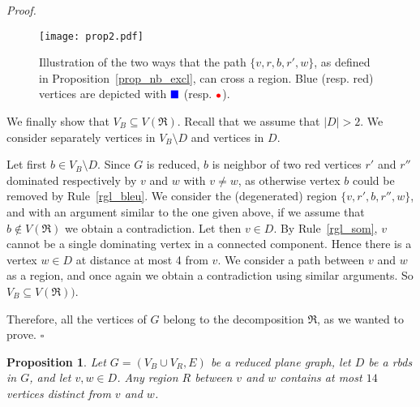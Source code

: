 \documentclass[a4paper,11pt]{article}
\newtheorem{prop} {Proposition}
\newcommand{\rrgl}   [1] {Rule~\ref{#1}\xspace}
\newcommand{\drb}    [0] {rbds\xspace}
\newenvironment{proof}{\noindent \textit{Proof. }}{\hfill$\square$\vspace{.2cm}}
\begin{document}
\begin{proof}
\begin{figure}[h]
\begin{center}
   \texttt{[image: prop2.pdf]}
\end{center}
   \caption{Illustration of the two ways that the path $\{v,r,b,r',w\}$, as defined in Proposition~\ref{prop_nb_excl}, can cross a region. Blue (resp. red) vertices are depicted with $\textcolor{blue}{\blacksquare}$ (resp. \LARGE{$\textcolor{red} {\bullet}$}\normalsize{)}. }
   \label{fig_prop}
\end{figure}

We finally show that $V_B \subseteq V(\Re)$. Recall that we assume that $|D| > 2$.  We consider separately vertices in $V_B \setminus D$ and vertices in $D$.

Let first $b \in V_B \setminus D$. Since $G$ is reduced,  $b$ is neighbor of two red vertices $r'$ and $r''$ dominated respectively by $v$ and $w$ with $v \neq w$, as otherwise vertex $b$ could be removed by \rrgl{rgl_bleu}. We consider the (degenerated) region $\{v,r',b,r'',w\}$, and with an argument similar to the one given above, if we assume that $b \notin V(\Re)$ we obtain a contradiction.
Let then $v \in D$. By \rrgl{rgl_som}, $v$ cannot be a single dominating vertex in a connected component. Hence there is a vertex $w \in D$ at distance at most 4 from $v$. We consider a path between $v$ and $w$ as a region, and once again we obtain a contradiction using similar arguments. So $V_B \subseteq V(\Re)) $.

Therefore, all the vertices of $G$ belong to the decomposition $\Re$, as we wanted to prove.
\end{proof}



\begin{prop}\label{prop_nb_incl}
Let $G=(V_B \cup V_R,E)$ be a reduced plane graph, let $D$ be a \drb in $G$, and let $v,w \in D$.
Any region $R$ between $v$ and $w$ contains at most $ 14 $ vertices distinct from $v$ and $w$.
\end{prop}
\end{document}
